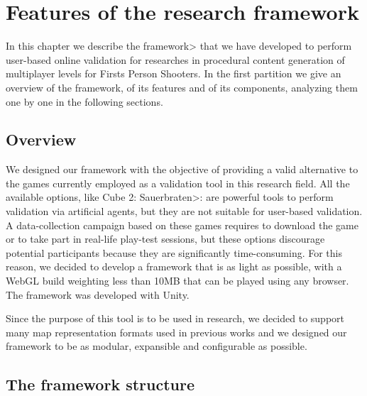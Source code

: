 \chapter{Features of the research framework}


In this chapter we describe the \<framework> that we have developed to perform user-based online validation for researches in procedural content generation of multiplayer levels for Firsts Person Shooters. In the first partition we give an overview of the framework, of its features and of its components, analyzing them one by one in the following sections.


\section{Overview}

We designed our framework with the objective of providing a valid alternative to the games currently employed as a validation tool in this research field. All the available options, like \<Cube 2: Sauerbraten>: are powerful tools to perform validation via artificial agents, but they are not suitable for user-based validation. A data-collection campaign based on these games requires to download the game or to take part in real-life play-test sessions, but these options discourage potential participants because they are significantly time-consuming. For this reason, we decided to develop a framework that is as light as possible, with a WebGL build weighting less than 10MB that can be played using any browser. The framework was developed with Unity.

\par

Since the purpose of this tool is to be used in research, we decided to support many map representation formats used in previous works and we designed our framework to be as modular, expansible and configurable as possible.


\section{The framework structure}

